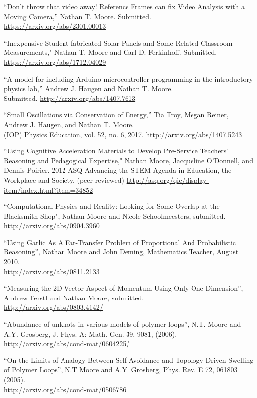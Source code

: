\documentclass[margin,line,letterpaper]{res}
\begin{document}
\begin{resume}
``Don't throw that video away! Reference Frames can fix Video Analysis with a Moving Camera,''
Nathan T. Moore.
Submitted.\\
\url{https://arxiv.org/abs/2301.00013}


``Inexpensive Student-fabricated Solar Panels and Some Related Classroom Measurements,"
Nathan T. Moore and Carl D. Ferkinhoff.
Submitted.\\
\url{https://arxiv.org/abs/1712.04029}

``A model for including Arduino microcontroller programming in the introductory physics lab,''
Andrew J. Haugen and Nathan T. Moore. \\
Submitted.
\url{http://arxiv.org/abs/1407.7613}

``Small Oscillations via Conservation of Energy,''
Tia Troy, Megan Reiner, Andrew J. Haugen, and Nathan T. Moore. \\
(IOP) Physics Education, vol. 52, no. 6, 2017.
\url{http://arxiv.org/abs/1407.5243}

``Using Cognitive Acceleration Materials to Develop Pre-Service Teachers' Reasoning and Pedagogical Expertise," 
Nathan Moore, Jacqueline O'Donnell, and Dennis Poirier.
2012 ASQ Advancing the STEM Agenda in Education, the Workplace and Society.
(peer reviewed)
\url{http://asq.org/qic/display-item/index.html?item=34852}

``Computational Physics and Reality: Looking for Some Overlap at the Blacksmith Shop",
Nathan Moore and Nicole Schoolmeesters,
submitted.\\
\url{http://arxiv.org/abs/0904.3960}

``Using Garlic As A Far-Transfer Problem of Proportional And Probabilistic Reasoning'',
Nathan Moore and John Deming, Mathematics Teacher, August 2010.\\
\url{http://arxiv.org/abs/0811.2133}

``Measuring the 2D Vector Aspect of Momentum Using Only One Dimension'',
Andrew Ferstl and Nathan Moore,
submitted.\\
\url{http://arxiv.org/abs/0803.4142/}

``Abundance of unknots in various models of polymer loops'',
N.T. Moore and A.Y. Grosberg,
J. Phys. A: Math. Gen. 39, 9081, (2006).\\
\url{http://arxiv.org/abs/cond-mat/0604225/}

``On the Limits of Analogy Between Self-Avoidance and Topology-Driven Swelling of Polymer Loops'',
N.T Moore and A.Y. Grosberg,
Phys. Rev. E 72, 061803 (2005).\\
\url{http://arxiv.org/abs/cond-mat/0506786}


\end{resume}
\end{document}
